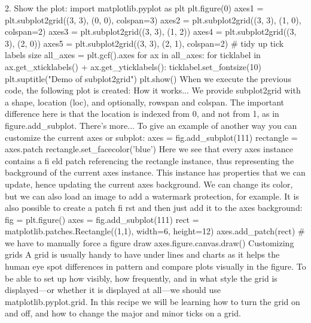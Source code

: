 2. Show the plot:
import matplotlib.pyplot as plt
plt.figure(0)
axes1 = plt.subplot2grid((3, 3), (0, 0), colspan=3)
axes2 = plt.subplot2grid((3, 3), (1, 0), colspan=2)
axes3 = plt.subplot2grid((3, 3), (1, 2))
axes4 = plt.subplot2grid((3, 3), (2, 0))
axes5 = plt.subplot2grid((3, 3), (2, 1), colspan=2)
# tidy up tick labels size
all_axes = plt.gcf().axes
for ax in all_axes:
 for ticklabel in ax.get_xticklabels() + ax.get_yticklabels():
 ticklabel.set_fontsize(10)
plt.suptitle("Demo of subplot2grid")
plt.show()
When we execute the previous code, the following plot is created:
How it works...
We provide subplot2grid with a shape, location (loc), and optionally, rowspan and
colspan. The important difference here is that the location is indexed from 0, and not
from 1, as in figure.add_subplot.
There's more...
To give an example of another way you can customize the current axes or subplot:
axes = fig.add_subplot(111)
rectangle = axes.patch
rectangle.set_facecolor('blue')
Here we see that every axes instance contains a fi eld patch referencing the rectangle
instance, thus representing the background of the current axes instance. This instance has
properties that we can update, hence updating the current axes background. We can change
its color, but we can also load an image to add a watermark protection, for example.
It is also possible to create a patch fi rst and then just add it to the axes background:
fig = plt.figure()
axes = fig.add_subplot(111)
rect = matplotlib.patches.Rectangle((1,1), width=6, height=12)
axes.add_patch(rect)
# we have to manually force a figure draw
axes.figure.canvas.draw()
Customizing grids
A grid is usually handy to have under lines and charts as it helps the human eye spot
differences in pattern and compare plots visually in the figure. To be able to set up how
visibly, how frequently, and in what style the grid is displayed—or whether it is displayed
at all—we should use matplotlib.pyplot.grid.
In this recipe we will be learning how to turn the grid on and off, and how to change the major
and minor ticks on a grid.
